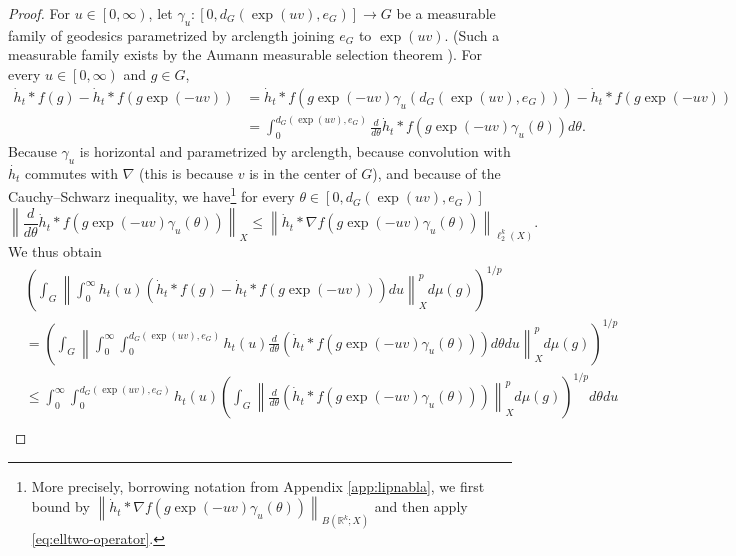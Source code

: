 \documentclass[11pt,reqno]{amsart}
\newcommand{\1}{\mathbf 1}
\begin{document}
\begin{proof}
For $u\in \left[0,\infty\right)$, let $\gamma_u:\left[0,d_G\left(\exp\left(uv\right),e_G\right)\right]\to G$ be a measurable family of geodesics parametrized by arclength joining $e_G$ to $\exp\left(uv\right)$. (Such a measurable family exists by the Aumann measurable selection theorem \cite[Theorem 6.9.13]{bogachev2007measure}). For every $u\in \left[0,\infty\right)$ and $g\in G$,
\begin{align*}
\dot{h}_t*f\left(g\right)-\dot{h}_t*f\left(g\exp\left(-uv\right)\right)&=\dot{h}_t*f\left(g\exp\left(-uv\right)\gamma_u\left(d_G\left(\exp\left(uv\right),e_G\right)\right)\right)-\dot{h}_t*f\left(g\exp\left(-uv\right)\right)\\
&=\int_0^{d_G\left(\exp\left(uv\right),e_G\right)} \frac{d}{d\theta}\dot{h}_t*f\left(g\exp\left(-uv\right)\gamma_u\left(\theta\right)\right) d\theta.
\end{align*}
Because $\gamma_u$ is horizontal and parametrized by arclength, because convolution with $\dot{h_t}$ commutes with $\nabla$ (this is because $v$ is in the center of $G$), and because of the Cauchy--Schwarz inequality, we have\footnote{More precisely, borrowing notation from Appendix \ref{app:lipnabla}, we first bound by $\left\|\dot{h}_t*\nabla f\left(g\exp\left(-uv\right)\gamma_u\left(\theta\right)\right)\right\|_{B\left(\mathbb{R}^k;X\right)}$ and then apply \eqref{eq:elltwo-operator}.} for every $\theta\in \left[0,d_G\left(\exp\left(uv\right),e_G\right)\right]$
\begin{equation}\label{eq:nablaConvolutionCommute}
 \left\|\frac{d}{d\theta}\dot{h}_t*f\left(g\exp\left(-uv\right)\gamma_u\left(\theta\right)\right)\right\|_X\le \left\|\dot{h}_t*\nabla f\left(g\exp\left(-uv\right)\gamma_u\left(\theta\right)\right)\right\|_{\ell_2^k\left(X\right)}.
\end{equation}
We thus obtain
\begin{align*}
&\left(\int_{G}\left\|\int_0^\infty h_t\left(u\right)\left(\dot{h}_t*f\left(g\right)-\dot{h}_t*f\left(g\exp\left(-uv\right)\right)\right)du\right\|_X^pd\mu\left(g\right)\right)^{1/p}\\
&=\left(\int_{G}\left\|\int_0^\infty \int_0^{d_G\left(\exp\left(uv\right),e_G\right)} h_t\left(u\right) \frac{d}{d\theta}\left(\dot{h}_t*f\left(g\exp\left(-uv\right)\gamma_u\left(\theta\right)\right)\right) d\theta du\right\|_X^pd\mu\left(g\right)\right)^{1/p}\\
&\le \int_0^\infty \int_0^{d_G\left(\exp\left(uv\right),e_G\right)} h_t\left(u\right) \left(\int_{G}\left\| \frac{d}{d\theta}\left(\dot{h}_t*f\left(g\exp\left(-uv\right)\gamma_u\left(\theta\right)\right)\right) \right\|_X^pd\mu\left(g\right)\right)^{1/p}d\theta du\\

\end{align*}
\end{proof}
\end{document}

